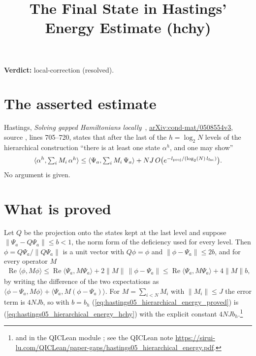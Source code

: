 \documentclass{article}
\title{The Final State in Hastings' Energy Estimate (hchy)}
\author{}
\date{}
\providecommand{\gapnote}[2]{\par\noindent\textbf{Verdict:} #1 (#2).\par}
\begin{document}
\maketitle
\gapnote{local-correction}{resolved}

\section{The asserted estimate}
Hastings, \emph{Solving gapped Hamiltonians locally}~\cite{Hastings2006Solving},
\href{https://arxiv.org/abs/cond-mat/0508554v3}{arXiv:cond-mat/0508554v3},
source , lines 705--720, states that after the last of the
$h=\log_2N$ levels of the hierarchical construction ``there is at least one
state $\alpha^h$, and one may show''
\begin{align}
 \langle\alpha^h,\textstyle\sum_iM_i\,\alpha^h\rangle
 \le\langle\Psi_a,\textstyle\sum_iM_i\,\Psi_a\rangle
 +NJ\,O\bigl(e^{-l_{\rm proj}/(\log_2(N)\,l_{\rm fac})}\bigr).
 \label{eq:hastings05_hierarchical_energy_hchy}
\end{align}
No argument is given.

\section{What is proved}
Let $Q$ be the projection onto the states kept at the last level and suppose
$\|\Psi_a-Q\Psi_a\|\le b<1$, the norm form of the deficiency used for every
level. Then $\phi=Q\Psi_a/\|Q\Psi_a\|$ is a unit vector with $Q\phi=\phi$ and
$\|\phi-\Psi_a\|\le2b$, and for every operator $M$
\begin{align}
 \operatorname{Re}\langle\phi,M\phi\rangle
 \le\operatorname{Re}\langle\Psi_a,M\Psi_a\rangle+2\|M\|\,\|\phi-\Psi_a\|
 \le\operatorname{Re}\langle\Psi_a,M\Psi_a\rangle+4\|M\|b,
 \label{eq:hastings05_hierarchical_energy_proved}
\end{align}
by writing the difference of the two expectations as
$\langle\phi-\Psi_a,M\phi\rangle+\langle\Psi_a,M(\phi-\Psi_a)\rangle$. For
$M=\sum_{i<N}M_i$ with $\|M_i\|\le J$ the error term is $4NJb$, so with $b=b_h$
(\ref{eq:hastings05_hierarchical_energy_proved}) is
(\ref{eq:hastings05_hierarchical_energy_hchy}) with the explicit constant
$4NJb_h$.\footnote{
    and
    in the QICLean module ; see the QICLean
    note \url{https://sirui-lu.com/QICLean/paper-gaps/hastings05_hierarchical_energy.pdf}.}
\end{document}
